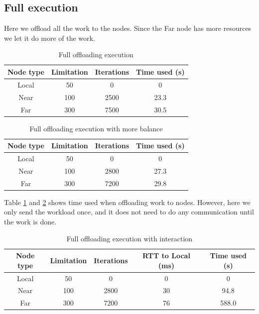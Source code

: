 \subsection{Full execution}
Here we offload all the work to the nodes. Since the Far node has more resources we let it do more of the work.
\begin{table}[h!]
    \centering
    \begin{tabular}[c]{|c|c|c|c|}
        \hline
        Node type & Limitation & Iterations & Time used (s)\\
        \hline
        \hline
        Local & 50 & 0 & 0 \\
        \hline
        Near & 100 & 2500 & 23.3 \\
        \hline
        Far & 300 & 7500 & 30.5 \\
        \hline
    \end{tabular}
    \caption{Full offloading execution}
    \label{tab:MEC_full_execution}
\end{table}

\begin{table}[h!]
    \centering
    \begin{tabular}[c]{|c|c|c|c|}
        \hline
        Node type & Limitation & Iterations & Time used (s)\\
        \hline
        \hline
        Local & 50 & 0 & 0 \\
        \hline
        Near & 100 & 2800 & 27.3 \\
        \hline
        Far & 300 & 7200 & 29.8 \\
        \hline
    \end{tabular}
    \caption{Full offloading execution with more balance}
    \label{tab:MEC_full_execution_balanced}
\end{table}

Table \ref{tab:MEC_full_execution} and \ref{tab:MEC_full_execution_balanced} shows time used when offloading work to nodes. However, here we only send the workload once, and it does not need to do any communication until the work is done.

\begin{table}[h!]
    \centering
    \begin{tabular}[c]{|c|c|c|c|c|}
        \hline
        Node type & Limitation & Iterations & RTT to Local (ms)& Time used (s)\\
        \hline
        \hline
        Local & 50 & 0 & 0 & 0 \\
        \hline
        Near & 100 & 2800 & 30 & 94.8 \\
        \hline
        Far & 300 & 7200 & 76 & 588.0 \\
        \hline
    \end{tabular}
    \caption{Full offloading execution with interaction}
    \label{tab:MEC_full_execution_latency}
\end{table}

